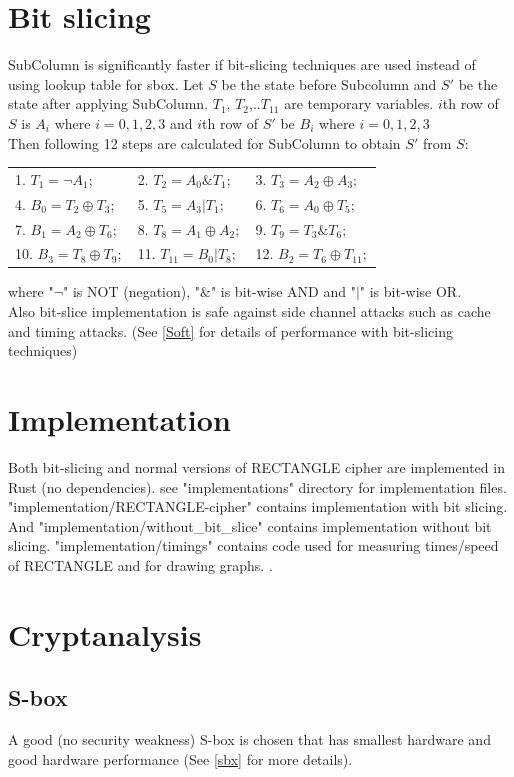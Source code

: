 \documentclass[final]{transcrypto}
\begin{document}
\section{Bit slicing}
SubColumn is significantly faster if bit-slicing techniques are used instead of using lookup table for sbox.
Let $S$ be the state before Subcolumn and $S'$ be the state after applying SubColumn. $T_{1}$, $T_{2}$,..$T_{11}$ are temporary variables. $i$th row of $S$ is 
$A_i$ where $i={0,1,2,3}$ and $i$th row of $S'$ be $B_i$ where $i={0,1,2,3}$\\
Then following 12 steps are calculated for SubColumn to obtain $S'$ from $S$:
\begin{table}[H]
	\begin{tabular}{lll}
1. $T_1=\neg A_1;$  & 2. $T_2=A_0\&T_1;$ & 3. $T_3=A_2\oplus A_3;$ \\
4. $B_0=T_2\oplus T_3;$ & 5. $T_5=A_3|T_1;$  & 6. $T_6=A_0\oplus T_5;$ \\
7. $B_1=A_2\oplus T_6;$ & 8. $T_8=A_1\oplus A_2;$ & 9. $T_9=T_3\&T_6;$ \\
10. $B_3=T_8\oplus T_9;$  & 11. $T_{11}=B_0|T_8;$ & 12. $B_2=T_6\oplus T_{11};$ \\
	\end{tabular}
\end{table}
where "$\neg$" is NOT (negation), "$\&$" is bit-wise AND and "$|$" is bit-wise OR.\\
Also bit-slice implementation is safe against side channel attacks such as cache and timing attacks.\cite{rectanle}
(See \ref{Soft} for details of performance with bit-slicing techniques)
\section{Implementation}
Both bit-slicing and normal versions of RECTANGLE cipher are implemented in Rust (no dependencies).
see "implementations" directory for implementation files. "implementation/RECTANGLE-cipher" contains implementation with bit slicing. And "implementation/without\_bit\_slice" contains implementation without bit slicing. "implementation/timings" contains code used for measuring times/speed of RECTANGLE and  for drawing graphs.
.\section{Cryptanalysis}
\subsection{S-box}
A good (no security weakness) S-box is chosen that has smallest hardware and good hardware performance (See \ref{sbx} for more details). 
\end{document}
